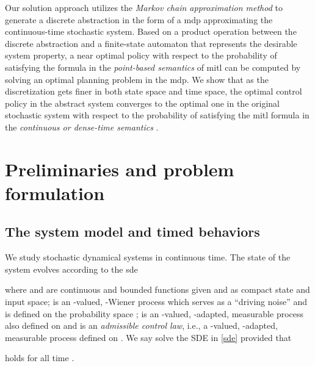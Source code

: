 \documentclass[letterpaper, 10 pt, conference]{ieeeconf}
\begin{document}
Our solution approach utilizes the \emph{Markov chain approximation
  method} \cite{kushner2001numerical} to generate a discrete
abstraction in the form of a \ac{mdp} approximating the
continuous-time stochastic system. Based on a product operation
between the discrete abstraction and a finite-state automaton that
represents the desirable system property, a near optimal policy with
respect to the probability of satisfying the formula in the
\emph{point-based semantics} of \ac{mitl} \cite{henzinger1991temporal}
can be computed by solving an optimal planning problem in the
\ac{mdp}. We show that as the discretization gets finer in both state
space and time space, the optimal control policy in the abstract
system converges to the optimal one in the original stochastic system
with respect to the probability of satisfying the \ac{mitl} formula in
the \emph{continuous or dense-time semantics} \cite{Alur1996}.













\section{Preliminaries and problem formulation}
\label{sec:prelim}



\subsection{The system model and timed behaviors}


We study stochastic dynamical systems in continuous time.
The state of the system evolves according to the \ac{sde}

where  and
 are continuous and bounded
functions given  and  as compact state and input
space;  is an -valued, -Wiener
process which serves as a ``driving noise'' and is defined on the
probability space ;  is an -valued,
-adapted, measurable process also defined on
 and  is an \emph{admissible control
  law}, i.e., a -valued, -adapted, measurable process
defined on . We say  solve the SDE in \eqref{sde} provided that

holds for all time .
\end{document}
